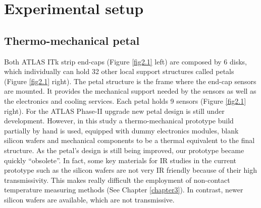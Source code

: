 \pagestyle{standard}

\chapter{Experimental setup}\label{chapter2}

	\thispagestyle{chapter-first-page}
	
	\section{Thermo-mechanical petal}\label{section2.1}
	
		Both ATLAS ITk strip end-caps (Figure \ref{fig2.1} left) are composed by 6 disks, which individually can hold 32 other local support structures called petals (Figure \ref{fig2.1} right). The petal structure is the frame where the end-cap sensors are mounted. It provides the mechanical support needed by the sensors as well as the electronics and cooling services. Each petal holds 9 sensors (Figure \ref{fig2.1} right). For the ATLAS Phase-II upgrade new petal design is still under development. However, in this study a thermo-mechanical prototype build partially by hand is used, equipped with dummy electronics modules, blank silicon wafers and mechanical components to be a thermal equivalent to the final structure. As the petal’s design is still being improved, our prototype became quickly “obsolete”. In fact, some key materials for IR studies in the current prototype such as the silicon wafers are not very IR friendly because of their high transmissivity. This makes really difficult the employment of non-contact temperature measuring methods (See Chapter \ref{chapter3}). In contrast, newer silicon wafers are available, which are not transmissive.
				
